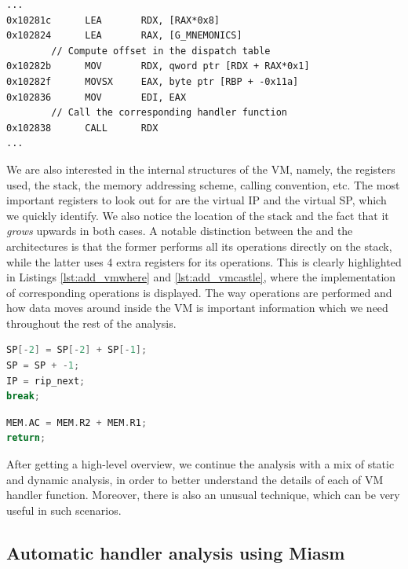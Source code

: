 \begin{lstlisting}[label={lst:indirect_call_vmcastle}, caption={TODO}]
...
0x10281c      LEA       RDX, [RAX*0x8]
0x102824      LEA       RAX, [G_MNEMONICS]
        // Compute offset in the dispatch table
0x10282b      MOV       RDX, qword ptr [RDX + RAX*0x1] 
0x10282f      MOVSX     EAX, byte ptr [RBP + -0x11a]
0x102836      MOV       EDI, EAX
        // Call the corresponding handler function
0x102838      CALL      RDX  
...
\end{lstlisting}

We are also interested in the internal structures of the \gls{VM}, namely, the
registers used, the stack, the memory addressing scheme, calling convention,
etc. The most important registers to look out for are the virtual \gls{IP} and
the virtual \gls{SP}, which we quickly identify. We also notice the location of
the stack and the fact that it \emph{grows} upwards in both cases. A notable
distinction between the  and the  architectures is that
the former performs all its operations directly on the stack, while the latter
uses 4 extra registers for its operations. This is clearly highlighted in
Listings \ref{lst:add_vmwhere} and \ref{lst:add_vmcastle}, where the
implementation of corresponding  operations is displayed. The way
operations are performed and how data moves around inside the \gls{VM} is
important information which we need throughout the rest of the analysis.

\begin{multicols}{2}
\begin{lstlisting}[language=c, label={lst:add_vmwhere}, caption={TODO}]
SP[-2] = SP[-2] + SP[-1];
SP = SP + -1;
IP = rip_next;
break;
\end{lstlisting}
\columnbreak
\begin{lstlisting}[language=c, label={lst:add_vmcastle}, caption={TODO}]
MEM.AC = MEM.R2 + MEM.R1;
return;
\end{lstlisting}
\end{multicols}

After getting a high-level overview, we continue the analysis with a mix of static and dynamic analysis, in order to better understand the details of each of \gls{VM} handler function. Moreover, there is also an unusual technique, which can be very useful in such scenarios.

\subsection{Automatic handler analysis using Miasm}
\label{sec:miasm}

